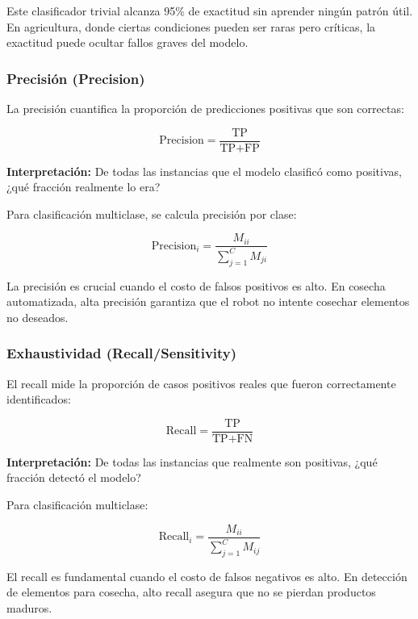 Este clasificador trivial alcanza 95\% de exactitud sin aprender ningún patrón útil. En agricultura, donde ciertas condiciones pueden ser raras pero críticas, la exactitud puede ocultar fallos graves del modelo.

\subsubsection{Precisión (Precision)}

La precisión cuantifica la proporción de predicciones positivas que son correctas:

\begin{equation}
\text{Precision} = \frac{\text{TP}}{\text{TP} + \text{FP}}
\end{equation}

\textbf{Interpretación:} De todas las instancias que el modelo clasificó como positivas, ¿qué fracción realmente lo era?

Para clasificación multiclase, se calcula precisión por clase:

\begin{equation}
\text{Precision}_i = \frac{M_{ii}}{\sum_{j=1}^{C} M_{ji}}
\end{equation}

La precisión es crucial cuando el costo de falsos positivos es alto. En cosecha automatizada, alta precisión garantiza que el robot no intente cosechar elementos no deseados.

\subsubsection{Exhaustividad (Recall/Sensitivity)}

El recall mide la proporción de casos positivos reales que fueron correctamente identificados:

\begin{equation}
\text{Recall} = \frac{\text{TP}}{\text{TP} + \text{FN}}
\end{equation}

\textbf{Interpretación:} De todas las instancias que realmente son positivas, ¿qué fracción detectó el modelo?

Para clasificación multiclase:

\begin{equation}
\text{Recall}_i = \frac{M_{ii}}{\sum_{j=1}^{C} M_{ij}}
\end{equation}

El recall es fundamental cuando el costo de falsos negativos es alto. En detección de elementos para cosecha, alto recall asegura que no se pierdan productos maduros.

